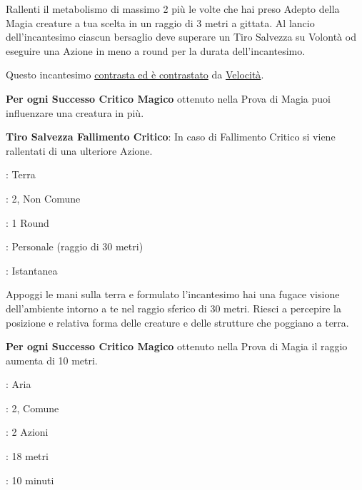 \begin{multicols}{2}
Rallenti il metabolismo di massimo 2 più le volte che hai preso Adepto della Magia creature a tua scelta in un raggio di 3 metri a gittata. Al lancio dell'incantesimo ciascun bersaglio deve superare un Tiro Salvezza su Volontà od eseguire una Azione in meno a round per la durata dell'incantesimo.

Questo incantesimo \hyperlink{contrastareincantesimi}{contrasta ed è contrastato} da \hyperlink{Velocità}{Velocità}.

\textbf{Per ogni Successo Critico Magico} ottenuto nella Prova di Magia puoi influenzare una creatura in più.

\textbf{Tiro Salvezza Fallimento Critico}: In caso di Fallimento Critico si viene rallentati di una ulteriore Azione.

\noindent\colorbox{OBSSgold!10}{
\begin{minipage}{0.95\linewidth}
\begin{description}[noitemsep, topsep=0pt, parsep=0pt, partopsep=0pt, leftmargin=0cm, labelwidth=1.3cm]
	\item[\textbf{Lista}]: Terra
	\item[\textbf{Livello}]: 2, Non Comune
	\item[\textbf{Lancio}]: 1 Round
	\item[\textbf{Gittata}]: Personale (raggio di 30 metri)
	\item[\textbf{Durata}]: Istantanea
\end{description}
\end{minipage}}\smallskip

Appoggi le mani sulla terra e formulato l'incantesimo hai una fugace visione dell'ambiente intorno a te nel raggio sferico di 30 metri.
Riesci a percepire la posizione e relativa forma delle creature e delle strutture che poggiano a terra.

\textbf{Per ogni Successo Critico Magico} ottenuto nella Prova di Magia il raggio aumenta di 10 metri.

\noindent\colorbox{OBSSgold!10}{
\begin{minipage}{0.95\linewidth}
\begin{description}[noitemsep, topsep=0pt, parsep=0pt, partopsep=0pt, leftmargin=0cm, labelwidth=1.3cm]
	\item[\textbf{Lista}]: Aria
	\item[\textbf{Livello}]: 2, Comune
	\item[\textbf{Lancio}]: 2 Azioni
	\item[\textbf{Gittata}]: 18 metri
	\item[\textbf{Durata}]: 10 minuti
\end{description}
\end{minipage}}\smallskip


\end{multicols}
